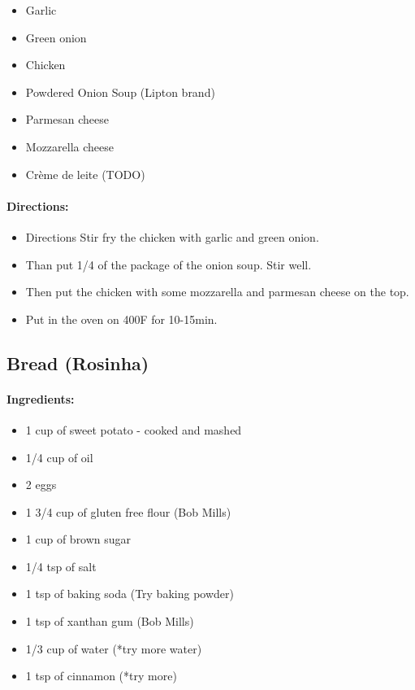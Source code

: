 \documentclass{article}
\begin{document}
\begin{itemize}
	\item Garlic 
	\item Green onion 
	\item Chicken 
	\item Powdered Onion Soup (Lipton brand) 
	\item Parmesan cheese 
	\item Mozzarella cheese 
	\item Crème de leite (TODO)
\end{itemize}

\paragraph{Directions:}
\begin{itemize}
	\item Directions Stir fry the chicken with garlic and green onion. 
	\item Than put 1/4 of the package of the onion soup. Stir well.
	\item Then put the chicken with some mozzarella and parmesan cheese on the top. 
	\item Put in the oven on 400F for 10-15min.
\end{itemize}

\subsection{Bread (Rosinha)}

\paragraph{Ingredients:}

\begin{itemize}
	\item 1 cup of sweet potato - cooked and mashed
	\item 1/4 cup of oil
	\item 2 eggs
	\item 1 3/4 cup of gluten free flour (Bob Mills)
	\item 1 cup of brown sugar 
	\item 1/4 tsp of salt
	\item 1 tsp of baking soda (Try baking powder)
	\item 1 tsp of xanthan gum (Bob Mills)
	\item 1/3 cup of water (*try more water)
	\item 1 tsp of cinnamon (*try more)
\end{itemize}
\end{document}
